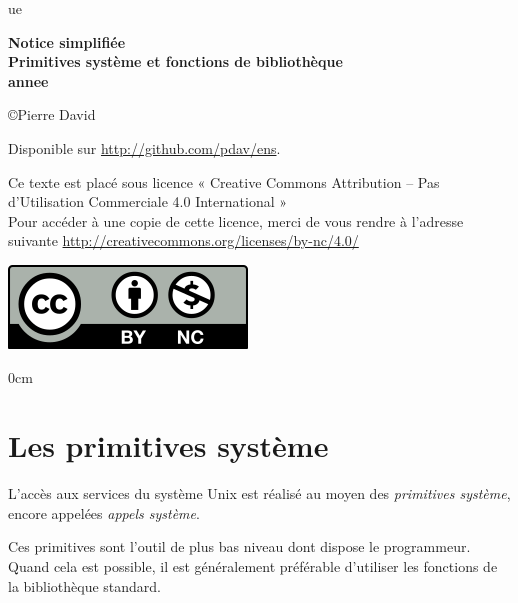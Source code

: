\documentclass [twoside] {report}
\newcommand {\tassertoc} {{ \setlength {\parskip} {0cm} \tableofcontents }}
\begin{document}
\thispagestyle {empty}

\begin {titlepage}
     {ue}

    \vfill

    \begin {center}
	\huge\bf
	Notice simplifiée \\
	\vspace* {5mm}
	Primitives système et fonctions de bibliothèque \\
	\vspace* {5mm}
	 {annee}
    \end {center}

    \vfill

    \begin {center}
	\copyright Pierre David

	Disponible sur \url {http://github.com/pdav/ens}.

        Ce texte est placé sous licence « Creative Commons Attribution
	-- Pas d’Utilisation Commerciale 4.0 International » \\
	Pour accéder à une copie de cette licence,
	merci de vous rendre à l'adresse suivante
	\url {http://creativecommons.org/licenses/by-nc/4.0/}

	\includegraphics [scale=.5] {by-nc}
    \end {center}
\end {titlepage}

\cleardoublepage
\tassertoc



\cleardoublepage

\chapter {Les primitives système}


L'accès aux services du système Unix est réalisé
au moyen des \textit {primitives système}, encore appelées
\textit {appels système}.

Ces primitives sont l'outil de plus bas niveau
dont dispose le programmeur. Quand cela est
possible, il est généralement préférable d'utiliser
les fonctions de la bibliothèque standard.
\end{document}
